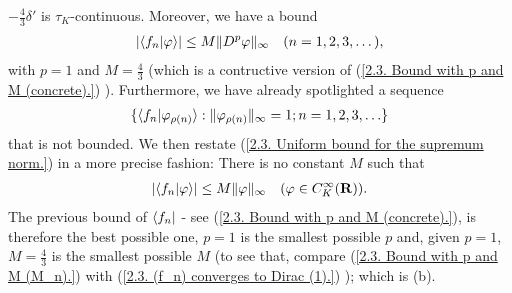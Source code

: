 %
  $\minus \frac{4}{3}\delta'$ is $\tau_K$-continuous. %
%
Moreover, we have a bound %
%
  \begin{align}
    \lvert \bra{f_n}\ket{\varphi} \rvert \leq M \| D^p \varphi \|_\infty 
    \quad (n=1, 2, 3, \dots), 
  \end{align}
%
with $p=1$ and $M= \frac{4}{3}$ (which is a contructive version of %
%
  (\ref{2.3. Bound with p and M (concrete).})%
%
). Furthermore, we have already spotlighted a sequence %
%
  \begin{align}
    \set{
      \langle{f_n} \lvert \phi_{\rho(n)} \rangle
    }{
      \| \phi_{\rho(n)} \|_\infty = 1; \counting{n}
    }
  \end{align}
%
that is not bounded. We then restate  %
%
  (\ref{2.3. Uniform bound for the supremum norm.}) %
%
in a more precise fashion: %
There is no constant $M$ such that %
%
  \begin{align}
    \lvert \langle f_n \lvert \varphi \rangle \rvert \leq 
      M 
    \| \varphi \|_{\infty}
    \quad (\varphi\in C_K^\infty({\mathbf R})).
  \end{align}
%
The previous bound of $\bra{f_n}$ %
%
  - see (\ref{2.3. Bound with p and M (concrete).}), 
%
is therefore the best possible one, \ie %
% 
    $p=1$ is the smallest possible $p$ and, given $p=1$,  %
    $M=\frac{4}{3}$ is the smallest possible $M$ %
    (to see that, compare %
      (\ref{2.3. Bound with p and M (M_n).}) with 
      (\ref{2.3. (f_n) converges to Dirac (1).})%
    ); which is (b). %
%
\newline\newline\noindent
%

